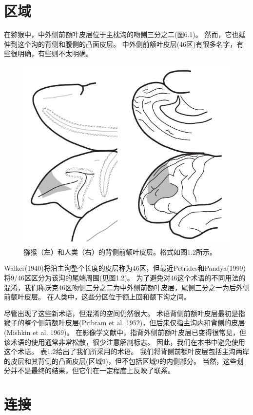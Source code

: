 \section{区域}

在猕猴中，中外侧前额叶皮层位于主枕沟的吻侧三分之二(图6.1)。
然而，它也延伸到这个沟的背侧和腹侧的凸面皮层。
中外侧前额叶皮层(46区)有很多名字，有些很明确，有些则不太明确。


\begin{figure}
	\centering
	\includegraphics[width=0.7\linewidth]{image_pfc/Fig_6_1}
	\caption{猕猴（左）和人类（右）的背侧前额叶皮层。格式如图1.2所示。}
	\label{fig:fig}
\end{figure}


Walker(1940)将沿主沟整个长度的皮层称为46区，但最近Petrides和Pandya(1999)将9/46区区分为该沟的尾端周围(见图1.2)。
为了避免对46这个术语的不同用法的混淆，我们称沃克46区吻侧三分之二为中外侧前额叶皮层，尾侧三分之一为后外侧前额叶皮层。
在人类中，这些分区位于额上回和额下沟之间。


尽管出现了这些新术语，但混淆的空间仍然很大。
术语背侧前额叶皮层最初是指猴子的整个侧前额叶皮层(Pribram et al. 1952)，但后来仅指主沟内和背侧的皮层(Mishkin et al. 1969)。
在影像学文献中，指背外侧前额叶皮层已变得很常见，但该术语的使用通常非常松散，很少注意解剖标志。
因此，我们在本书中避免使用这个术语。
表1.2给出了我们所采用的术语。
我们将背侧前额叶皮层包括主沟两岸的皮层和其背侧的凸面皮层(区域9)，但不包括区域9的内侧部分。
当然，这些划分并不是最终的结果，但它们在一定程度上反映了联系。



\section{连接}

